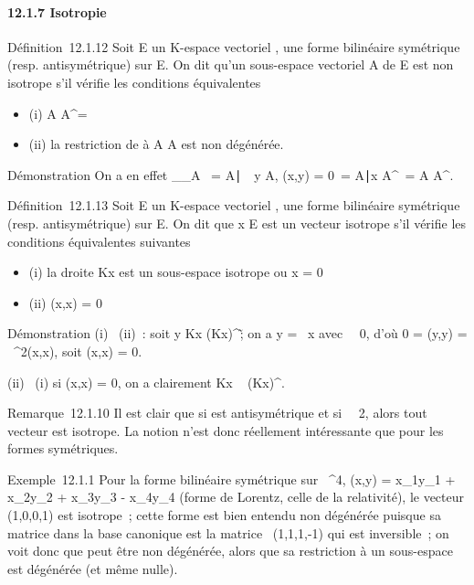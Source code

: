\documentclass[]{article}
\begin{document}
\paragraph{12.1.7 Isotropie}

Définition~12.1.12 Soit E un K-espace vectoriel , \phi une forme bilinéaire
symétrique (resp. antisymétrique) sur E. On dit qu'un sous-espace
vectoriel A de E est non isotrope s'il vérifie les conditions
équivalentes

\begin{itemize}
\itemsep1pt\parskip0pt
\item
  (i) A \bigcap A^\bot = \0\
\item
  (ii) la restriction de \phi à A \times A est non dégénérée.
\end{itemize}

Démonstration On a en effet
\mathrmKer\phi__A\timesA~
= \x \in
A∣\forall~~y \in A, \phi(x,y) =
0\ = \x \in
A∣x \in A^\bot\ = A \bigcap
A^\bot.

Définition~12.1.13 Soit E un K-espace vectoriel , \phi une forme bilinéaire
symétrique (resp. antisymétrique) sur E. On dit que x \in E est un vecteur
isotrope s'il vérifie les conditions équivalentes suivantes

\begin{itemize}
\itemsep1pt\parskip0pt
\item
  (i) la droite Kx est un sous-espace isotrope ou x = 0
\item
  (ii) \phi(x,x) = 0
\end{itemize}

Démonstration (i) \rigtharrow~(ii)~: soit y \in Kx \bigcap
(Kx)^\bot\diagdown\0\~; on a y = \lambda~x
avec \lambda~\neq~0, d'où 0 = \phi(y,y) =
\lambda~^2\phi(x,x), soit \phi(x,x) = 0.

(ii) \rigtharrow~(i) si \phi(x,x) = 0, on a clairement Kx \subset~ (Kx)^\bot.

Remarque~12.1.10 Il est clair que si \phi est antisymétrique et si
\mathrmcarK\mathrel\neq~~2,
alors tout vecteur est isotrope. La notion n'est donc réellement
intéressante que pour les formes symétriques.

Exemple~12.1.1 Pour la forme bilinéaire symétrique sur ~^4,
\phi(x,y) = x_1y_1 + x_2y_2 +
x_3y_3 - x_4y_4 (forme de Lorentz,
celle de la relativité), le vecteur (1,0,0,1) est isotrope~; cette forme
est bien entendu non dégénérée puisque sa matrice dans la base canonique
est la matrice
\mathrmdiag~(1,1,1,-1) qui
est inversible~; on voit donc que \phi peut être non dégénérée, alors que
sa restriction à un sous-espace est dégénérée (et même nulle).
\end{document}
